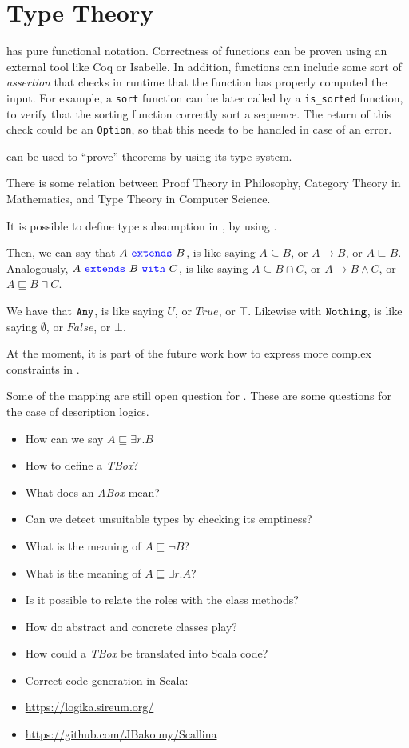 \section{Type Theory}

\Soda has pure functional notation.
Correctness of functions can be proven using an external tool like Coq or Isabelle.
In addition, functions can include some sort of \textit{assertion} that checks in runtime that the function has properly computed the input.
For example, a \texttt{sort} function can be later called by a \texttt{is\_sorted} function, to verify that the sorting function correctly sort a sequence.
The return of this check could be an \texttt{Option}, so that this needs to be handled in case of an error.

\Soda can be used to ``prove'' theorems by using its type system.

There is some relation between Proof Theory in Philosophy, Category Theory in Mathematics, and Type Theory in Computer Science.

It is possible to define type subsumption in \Soda, by using \sextends.

Then, we can say that $A \ \sextends\ B$, is like saying $A \subseteq B$, or $A \to B$, or $A \sqsubseteq B$.
Analogously, $A \ \sextends\ B \ \swith\ C$, is like saying $A \subseteq B \cap C $, or $A \to B \land C$, or $A \sqsubseteq B \sqcap C$.

We have that $\texttt{{Any}}$, is like saying $U$, or $True$, or $\top$.
Likewise with $\texttt{{Nothing}}$, is like saying $\emptyset$, or $False$, or $\bot$.

At the moment, it is part of the future work how to express more complex constraints in \Soda.

Some of the mapping are still open question for \Soda.
These are some questions for the case of description logics.

\begin{itemize}
    \item How can we say $A \sqsubseteq \exists r. B $
    \item How to define a \textit{TBox}?
    \item What does an \textit{ABox} mean?
    \item Can we detect unsuitable types by checking its emptiness?
    \item What is the meaning of $A \sqsubseteq \lnot B$?
    \item What is the meaning of $A \sqsubseteq \exists r. A$?
    \item Is it possible to relate the roles with the class methods?
    \item How do abstract and concrete classes play?
    \item How could a \textit{TBox} be translated into Scala code?
\end{itemize}

\begin{itemize}
    \item Correct code generation in Scala:
    \item \url{https://logika.sireum.org/}
    \item \url{https://github.com/JBakouny/Scallina}
\end{itemize}

